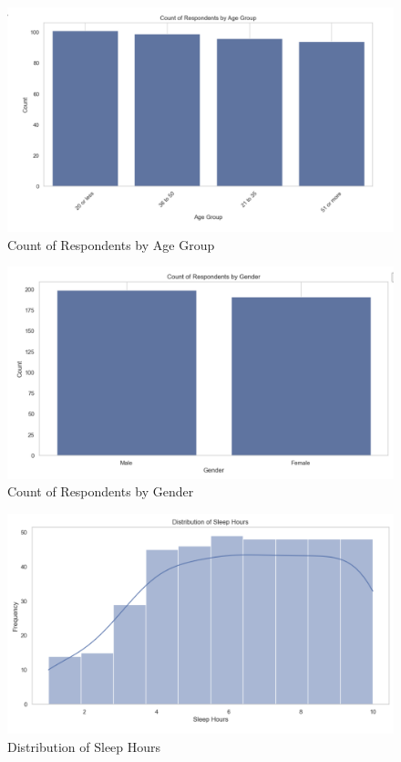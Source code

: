 \documentclass[runningheads]{llncs}
\begin{document}
\begin{enumerate}
\begin{figure}
    \centering
    \includegraphics[width=1.0\linewidth]{eda6.png}
    \caption{Count of Respondents by Age Group} 
    \label{fig:enter-label}
\end{figure}

\begin{figure}
    \centering
    \includegraphics[width=1.0\linewidth]{eda7.png}
    \caption{Count of Respondents by Gender} 
    \label{fig:enter-label}
\end{figure}

\begin{figure}
    \centering
    \includegraphics[width=1.0\linewidth]{eda8.png}
    \caption{Distribution of Sleep Hours} 
    \label{fig:enter-label}
\end{figure}


\end{enumerate}
\end{document}
